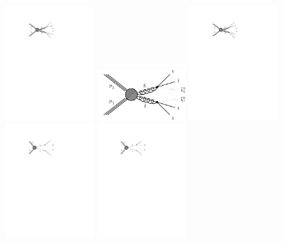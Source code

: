 \begin{figure}
	\centering
	\includegraphics[width=0.30\textwidth]{results/figs/T1bbbb}
	\includegraphics[width=0.30\textwidth]{results/figs/T1tttt}
	\includegraphics[width=0.30\textwidth]{results/figs/T1qqqq}
	\includegraphics[width=0.30\textwidth]{results/figs/T2bb}
	\includegraphics[width=0.30\textwidth]{results/figs/T2tt}

\end{figure}

